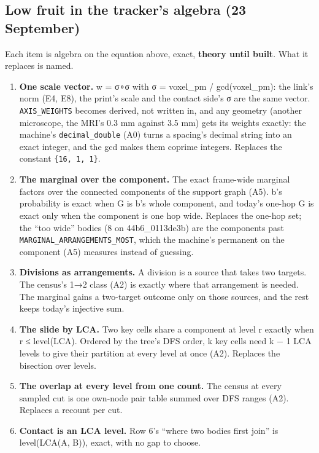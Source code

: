 \subsection{\texorpdfstring{Low fruit in the tracker's algebra (23 September)}{Low fruit in the tracker's algebra (23 September)}}

Each item is algebra on the equation above, exact, \textbf{theory until built}. What it replaces is named.

\begin{enumerate}
\item \textbf{One scale vector.} w = σ∘σ with σ = voxel\_\allowbreak{}pm / gcd(voxel\_\allowbreak{}pm): the link's norm (E4, E8), the print's scale and the contact side's σ are the same vector. \texttt{AXIS\_\allowbreak{}WEIGHTS} becomes derived, not written in, and any geometry (another microscope, the MRI's 0.3 mm against 3.5 mm) gets its weights exactly: the machine's \texttt{decimal\_\allowbreak{}double} (A0) turns a spacing's decimal string into an exact integer, and the gcd makes them coprime integers. Replaces the constant \texttt{\{16, 1, 1\}}.
\item \textbf{The marginal over the component.} The exact frame-wide marginal factors over the connected components of the support graph (A5). b's probability is exact when G is b's whole component, and today's one-hop G is exact only when the component is one hop wide. Replaces the one-hop set; the “too wide” bodies (8 on 44b6\_\allowbreak{}0113de3b) are the components past \texttt{MARGINAL\_\allowbreak{}ARRANGEMENTS\_\allowbreak{}MOST}, which the machine's permanent on the component (A5) measures instead of guessing.
\item \textbf{Divisions as arrangements.} A division is a source that takes two targets. The census's 1→2 class (A2) is exactly where that arrangement is needed. The marginal gains a two-target outcome only on those sources, and the rest keeps today's injective sum.
\item \textbf{The slide by LCA.} Two key cells share a component at level r exactly when r ≤ level(LCA). Ordered by the tree's DFS order, k key cells need k − 1 LCA levels to give their partition at every level at once (A2). Replaces the bisection over levels.
\item \textbf{The overlap at every level from one count.} The census at every sampled cut is one own-node pair table summed over DFS ranges (A2). Replaces a recount per cut.
\item \textbf{Contact is an LCA level.} Row 6's “where two bodies first join” is level(LCA(A, B)), exact, with no gap to choose.
\end{enumerate}

